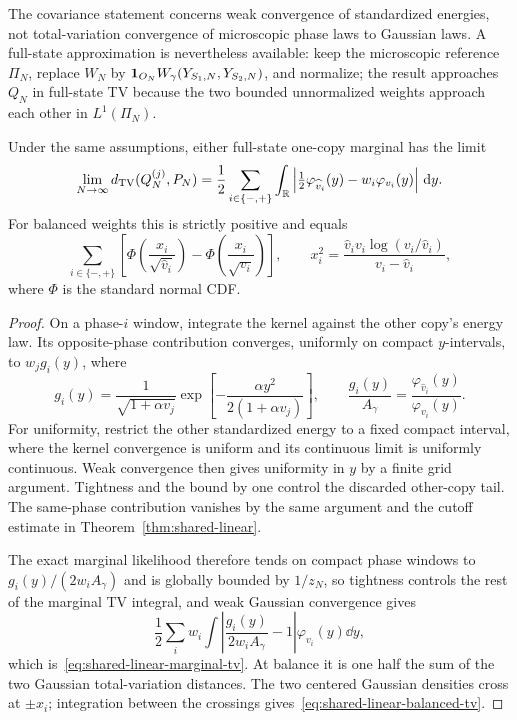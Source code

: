 The covariance statement concerns weak convergence of standardized
energies, not total-variation convergence of microscopic phase laws to
Gaussian laws. A full-state approximation is nevertheless available:
keep the microscopic reference $\Pi_N$, replace $W_N$ by
$\mathbf 1_{O_N}W_\gamma(Y_{S_1,N},Y_{S_2,N})$, and normalize; the result
approaches $Q_N$ in full-state TV because the two bounded unnormalized
weights approach each other in $L^1(\Pi_N)$.

\begin{proposition}
\label{prop:shared-linear-tv}
Under the same assumptions, either full-state one-copy marginal has
the limit
\begin{equation}
 \lim_{N\to\infty}d_{\mathrm{TV}}(Q_N^{(j)},P_N)
 =\frac12\sum_{i\in\{-,+\}}\int_\mathbb R
       \left|\tfrac12\varphi_{\widehat v_i}(y)
                                  -w_i\varphi_{v_i}(y)\right|\,\mathrm d y.
 \label{eq:shared-linear-marginal-tv}
\end{equation}
For balanced weights this is strictly positive and equals
\begin{equation}
 \sum_{i\in\{-,+\}}
 \left[\Phi\left(\frac{x_i}{\sqrt{\widehat v_i}}\right)
       -\Phi\left(\frac{x_i}{\sqrt{v_i}}\right)\right],\qquad
 x_i^2=\frac{\widehat v_i v_i\log(v_i/\widehat v_i)}{v_i-\widehat v_i},
 \label{eq:shared-linear-balanced-tv}
\end{equation}
where $\Phi$ is the standard normal CDF.
\end{proposition}
\begin{proof}
On a phase-$i$ window, integrate the kernel against the other copy's
energy law. Its opposite-phase contribution converges, uniformly on
compact $y$-intervals, to $w_jg_i(y)$, where
\begin{equation}
 g_i(y)=\frac{1}{\sqrt{1+\alpha v_j}}
        \exp\left[-\frac{\alpha y^2}{2(1+\alpha v_j)}\right],
 \qquad
 \frac{g_i(y)}{A_\gamma}
     =\frac{\varphi_{\widehat v_i}(y)}{\varphi_{v_i}(y)}.
 \label{eq:shared-linear-marginal-kernel}
\end{equation}
For uniformity, restrict the other standardized energy to a fixed
compact interval, where the kernel convergence is uniform
and its continuous limit is uniformly continuous. Weak convergence
then gives uniformity in $y$ by a finite grid argument. Tightness and
the bound by one control the discarded other-copy tail. The same-phase
contribution vanishes by the same argument and the cutoff estimate in
Theorem~\ref{thm:shared-linear}.

The exact marginal likelihood therefore tends on compact phase
windows to $g_i(y)/(2w_iA_\gamma)$ and is globally bounded by $1/z_N$,
so tightness controls the rest of the marginal TV integral, and weak
Gaussian convergence gives
\[
 \frac12\sum_i w_i\int
 \left|\frac{g_i(y)}{2w_iA_\gamma}-1\right|
                      \varphi_{v_i}(y)\dd y,
\]
which is~\eqref{eq:shared-linear-marginal-tv}. At balance it is one
half the sum of the two Gaussian total-variation distances. The two
centered Gaussian densities cross at $\pm x_i$; integration between
the crossings gives~\eqref{eq:shared-linear-balanced-tv}.
\end{proof}

